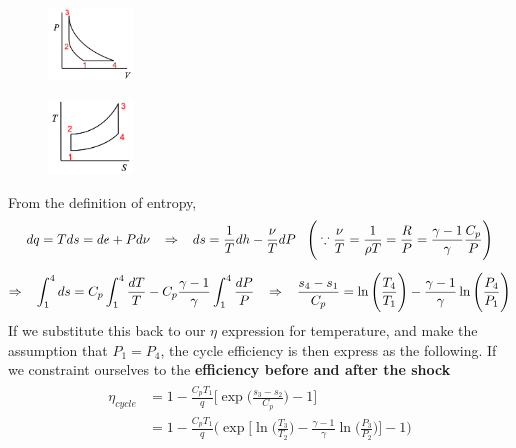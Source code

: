 \documentclass[a4paper,10pt]{article}
\begin{document}
\begin{multicols}{2}
    \begin{figure}[H]
        \centering
        \includegraphics[width=0.2\textwidth]{Figure/PV.png}
    \end{figure}
    \begin{figure}[H]
        \centering
        \includegraphics[width=0.2\textwidth]{Figure/TS.png}
    \end{figure}
\end{multicols}
\vspace*{-0.5cm}
From the definition of entropy,
\begin{gather*}
    dq = Tds = de+Pd\nu\hspace*{0.3cm}\Rightarrow\hspace*{0.3cm}ds = \frac{1}{T}dh-\frac{\nu}{T}dP\hspace*{0.3cm}\Bigg(\because\frac{\nu}{T} = \frac{1}{\rho T}=\frac{R}{P} = \frac{\gamma-1}{\gamma}\frac{C_p}{P}\Bigg)\\[0.2cm]
    \Rightarrow\hspace*{0.3cm}\int_{1}^{4}ds = C_p\int_{1}^{4}\frac{dT}{T}-C_p\frac{\gamma -1}{\gamma}\int_{1}^{4}\frac{dP}{P}\hspace*{0.3cm}\Rightarrow\hspace*{0.3cm}\frac{s_4-s_1}{C_p}=\ln\Bigg(\frac{T_4}{T_1}\Bigg)-\frac{\gamma-1}{\gamma}\ln\Bigg(\frac{P_4}{P_1}\Bigg)
\end{gather*}
If we substitute this back to our $\eta$ expression for temperature, and make the assumption that $P_1=P_4$, the cycle efficiency is then express as the following. If we constraint ourselves to the \textbf{efficiency before and after the shock}
\begin{gather*}
    \begin{split}
        \eta_{cycle} &= 1-\frac{C_pT_1}{q}\Bigg[\exp\Bigg(\frac{s_3-s_2}{C_p}\Bigg)-1\Bigg]\\[0.2cm]
        &= 1-\frac{C_pT_1}{q}\Bigg(\exp\Bigg[\ln\Bigg(\frac{T_3}{T_2}\Bigg)-\frac{\gamma-1}{\gamma}\ln\Bigg(\frac{P_3}{P_2}\Bigg)\Bigg]-1\Bigg)
    \end{split}
\end{gather*}
\end{document}
